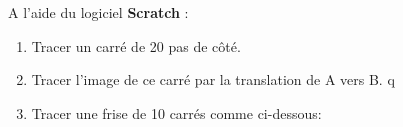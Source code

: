 \def\theme{TP - Frises et pavages}
\def\date{20/11/2023}
\def\authors{
    PESIN - CADOT - COURTIN
}

\def\tikzScale{0.5cm}
\def\side{3}
\def\figShift{(0, 0)}
\def\fig{(0,0) -- (\side,0) -- (\side,\side) -- (0,\side) -- cycle}

\newcommand{\drawSquare}[2]{
    \draw[line width= 0.25mm, #1, shift= #2] \fig;
}

A l'aide du logiciel \textbf{Scratch} :
\begin{enumerate}

    \item Tracer un carré de 20 pas de côté.\\
    \begin{center}
    \end{center}

    \item Tracer l'image de ce carré par la translation de A vers B.
    q
    \item Tracer une frise de 10 carrés comme ci-dessous:
    \begin{center}
    \end{center}
\end{enumerate}


\vspace*{0.5cm}

